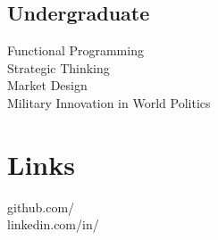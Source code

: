 \documentclass[]{deedy-resume-openfont}
\begin{document}
\begin{minipage}[t]{0.33\textwidth}
\subsection{Undergraduate}
Functional Programming \\
Strategic Thinking\\
Market Design \\
Military Innovation in World Politics

\sectionsep


\section{Links} 
github.com/\href{https://github.com/kuang}{} \\
linkedin.com/in/\href{https://www.linkedin.com/in/kuangjustin}{} \\
\sectionsep

%
%


\end{minipage}
\end{document}

